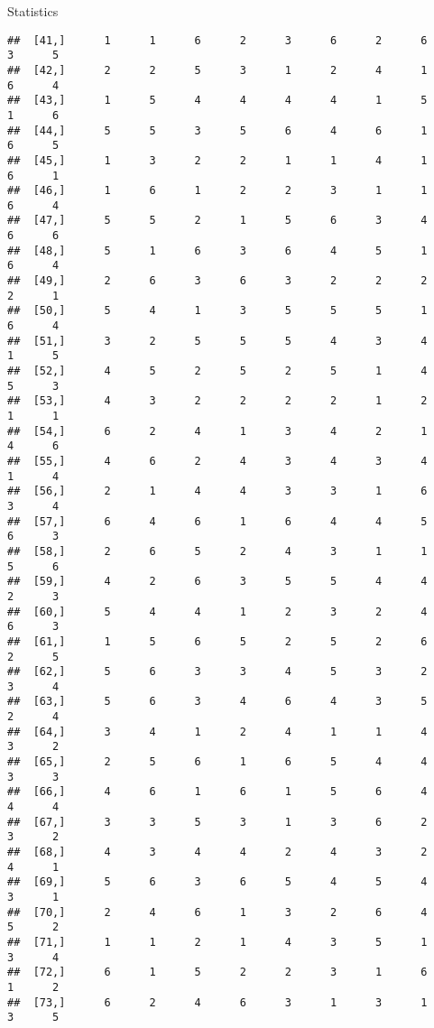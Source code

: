\documentclass[
  ignorenonframetext,
]{beamer}
\begin{document}
\begin{frame}[fragile]{Statistics}
\begin{verbatim}
##  [41,]      1      1      6      2      3      6      2      6      3      5
##  [42,]      2      2      5      3      1      2      4      1      6      4
##  [43,]      1      5      4      4      4      4      1      5      1      6
##  [44,]      5      5      3      5      6      4      6      1      6      5
##  [45,]      1      3      2      2      1      1      4      1      6      1
##  [46,]      1      6      1      2      2      3      1      1      6      4
##  [47,]      5      5      2      1      5      6      3      4      6      6
##  [48,]      5      1      6      3      6      4      5      1      6      4
##  [49,]      2      6      3      6      3      2      2      2      2      1
##  [50,]      5      4      1      3      5      5      5      1      6      4
##  [51,]      3      2      5      5      5      4      3      4      1      5
##  [52,]      4      5      2      5      2      5      1      4      5      3
##  [53,]      4      3      2      2      2      2      1      2      1      1
##  [54,]      6      2      4      1      3      4      2      1      4      6
##  [55,]      4      6      2      4      3      4      3      4      1      4
##  [56,]      2      1      4      4      3      3      1      6      3      4
##  [57,]      6      4      6      1      6      4      4      5      6      3
##  [58,]      2      6      5      2      4      3      1      1      5      6
##  [59,]      4      2      6      3      5      5      4      4      2      3
##  [60,]      5      4      4      1      2      3      2      4      6      3
##  [61,]      1      5      6      5      2      5      2      6      2      5
##  [62,]      5      6      3      3      4      5      3      2      3      4
##  [63,]      5      6      3      4      6      4      3      5      2      4
##  [64,]      3      4      1      2      4      1      1      4      3      2
##  [65,]      2      5      6      1      6      5      4      4      3      3
##  [66,]      4      6      1      6      1      5      6      4      4      4
##  [67,]      3      3      5      3      1      3      6      2      3      2
##  [68,]      4      3      4      4      2      4      3      2      4      1
##  [69,]      5      6      3      6      5      4      5      4      3      1
##  [70,]      2      4      6      1      3      2      6      4      5      2
##  [71,]      1      1      2      1      4      3      5      1      3      4
##  [72,]      6      1      5      2      2      3      1      6      1      2
##  [73,]      6      2      4      6      3      1      3      1      3      5

\end{verbatim}
\end{frame}
\end{document}
